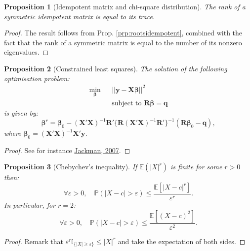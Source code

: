 \documentclass[
]{book}
\newtheorem{proposition}{Proposition}[chapter]
\theoremstyle{definition}
\theoremstyle{definition}
\theoremstyle{definition}
\theoremstyle{definition}
\theoremstyle{remark}
\begin{document}
\begin{proposition}[Idempotent matrix and chi-square distribution]
\protect\hypertarget{prp:chi2idempotent}{}\label{prp:chi2idempotent}The rank of a symmetric idempotent matrix is equal to its trace.
\end{proposition}

\begin{proof}
The result follows from Prop. \ref{prp:rootsidempotent}, combined with the fact that the rank of a symmetric matrix is equal to the number of its nonzero eigenvalues.
\end{proof}

\begin{proposition}[Constrained least squares]
\protect\hypertarget{prp:constrainedLS}{}\label{prp:constrainedLS}The solution of the following optimisation problem:
\begin{eqnarray*}
\underset{\boldsymbol\beta}{\min} && || \mathbf{y} - \mathbf{X}\boldsymbol\beta ||^2 \\
&& \mbox{subject to } \mathbf{R}\boldsymbol\beta = \mathbf{q}
\end{eqnarray*}
is given by:
\[
\boxed{\boldsymbol\beta^r = \boldsymbol\beta_0 - (\mathbf{X}'\mathbf{X})^{-1} \mathbf{R}'\{\mathbf{R}(\mathbf{X}'\mathbf{X})^{-1}\mathbf{R}'\}^{-1}(\mathbf{R}\boldsymbol\beta_0 - \mathbf{q}),}
\]
where \(\boldsymbol\beta_0=(\mathbf{X}'\mathbf{X})^{-1}\mathbf{X}'\mathbf{y}\).
\end{proposition}

\begin{proof}
See for instance \href{http://jackman.stanford.edu/classes/350B/07/ftestforWeb.pdf}{Jackman, 2007}.
\end{proof}

\begin{proposition}[Chebychev's inequality]
\protect\hypertarget{prp:chebychev}{}\label{prp:chebychev}If \(\mathbb{E}(|X|^r)\) is finite for some \(r>0\) then:
\[
\forall \varepsilon > 0, \quad \mathbb{P}(|X - c|>\varepsilon) \le \frac{\mathbb{E}[|X - c|^r]}{\varepsilon^r}.
\]
In particular, for \(r=2\):
\[
\forall \varepsilon > 0, \quad \mathbb{P}(|X - c|>\varepsilon) \le \frac{\mathbb{E}[(X - c)^2]}{\varepsilon^2}.
\]
\end{proposition}

\begin{proof}
Remark that \(\varepsilon^r \mathbb{I}_{\{|X| \ge \varepsilon\}} \le |X|^r\) and take the expectation of both sides.
\end{proof}
\end{document}
